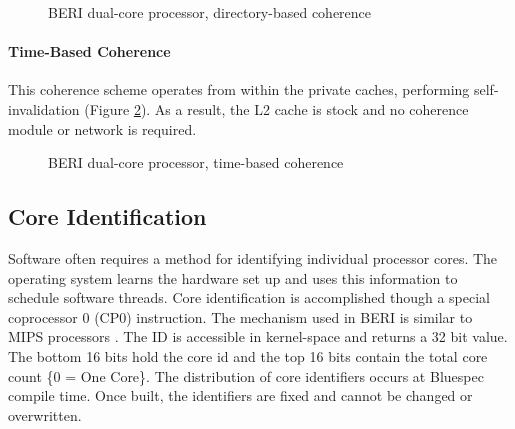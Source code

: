 		\begin{figure}[t]
			\centering 
				\caption{BERI dual-core processor, directory-based coherence} 
				\label{beri_directory}
		\end{figure}
		
		\paragraph{Time-Based Coherence} This coherence scheme operates from within the private caches, performing self-invalidation (Figure \ref{beri_timebased}). As a result, the L2 cache is stock and no coherence module or network is required.
		
		\begin{figure}[t]
			\centering 
				\caption{BERI dual-core processor, time-based coherence}
				\label{beri_timebased}
		\end{figure}


	\subsection{Core Identification}
		Software often requires a method for identifying individual processor cores. The operating system learns the hardware set up and uses this information to schedule software threads. Core identification is accomplished though a special coprocessor 0 (CP0) instruction. The mechanism used in BERI is similar to MIPS processors \cite{MIPS}. The ID is accessible in kernel-space and returns a 32 bit value. The bottom 16 bits hold the core id and the top 16 bits contain the total core count \{0 = One Core\}.
		The distribution of core identifiers occurs at Bluespec compile time. Once built, the identifiers are fixed and cannot be changed or overwritten. 

		\begin{comment}
		\begin{figure}[!h]
		\centering
			\newcommand{\colorbitbox}[3]{%
			\rlap{\bitbox{#2}{\color{#1}\rule{\width}{\height}}}%
			\bitbox{#2}{#3}}
			\definecolor{lightcyan}{rgb}{0.6,1,1}
			\definecolor{lightgreen}{rgb}{0.7,1,0.7}
			\begin{bytefield}[bitheight=\widthof{~Valid~},bitwidth=\widthof{\large x~},
			boxformatting={\centering\small}]{32}
			\bitheader[endianness=big]{31,16,15,0} \\
			\colorbitbox{lightgreen}{16}{Total Core Count} &
			\colorbitbox{lightcyan}{16}{Individual Core ID} &
			\end{bytefield}
			\caption{BERI Core Identification} 
			\label{core_id}
		\end{figure}
		\end{comment}
		

